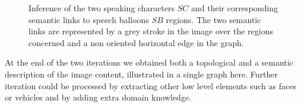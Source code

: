  \begin{figure}[!ht]  %
   \centering
   \hspace{0.5em}
  \caption[Inference of the speaking characters and their corresponding semantic links to speech balloons]{Inference of the two speaking characters $SC$ and their corresponding semantic links to speech balloons $SB$ regions.
  The two semantic links are represented by a grey stroke in the image over the regions concerned and a non oriented horizontal edge in the graph.
  }
  \label{fig:kn:final_information}
 \end{figure}

At the end of the two iterations we obtained both a topological and a semantic description of the image content, illustrated in a single graph here.
Further iteration could be processed by extracting other low level elements such as faces or vehicles and by adding extra domain knowledge.



